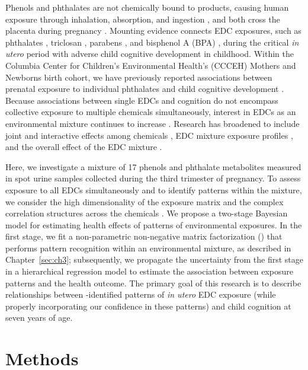 Phenols and phthalates are not chemically bound to products, causing human exposure through inhalation, absorption, and ingestion \cite{vandenberg2007human}, and both cross the placenta during pregnancy \cite{schonfelder2002parent, mose2007phthalate}. Mounting evidence connects EDC exposures, such as phthalates \cite{van2020phthalate, nidens2020prenatal, kim2018association, doherty2017prenatal, kim2011prenatal}, triclosan \cite{jackson2018identifying, guo2020early}, parabens \cite{freire2020association}, and bisphenol A (BPA) \cite{jiang2020prenatal, lin2017prenatal}, during the critical \textit{in utero} period with adverse child cognitive development in childhood. Within the Columbia Center for Children’s Environmental Health's (CCCEH) Mothers and Newborns birth cohort, we have previously reported associations between prenatal exposure to individual phthalates and child cognitive development \cite{factor2014persistent, whyatt2012maternal}. Because associations between single EDCs and cognition do not encompass collective exposure to multiple chemicals simultaneously, interest in EDCs as an environmental mixture continues to increase \cite{braun2016can, taylor16}. Research has broadened to include joint and interactive effects among chemicals \cite{hu2021prenatal}, EDC mixture exposure profiles \cite{kalloo2021chemical}, and the overall effect of the EDC mixture \cite{tanner2020early}.

Here, we investigate a mixture of 17 phenols and phthalate metabolites measured in spot urine samples collected during the third trimester of pregnancy. To assess exposure to all EDCs simultaneously and to identify patterns within the mixture, we consider the high dimensionality of the exposure matrix and the complex correlation structures across the chemicals \cite{taylor16}. We propose a two-stage Bayesian model for estimating health effects of patterns of environmental exposures. In the first stage, we fit a non-parametric non-negative matrix factorization (\bnmfc) that performs pattern recognition within an environmental mixture, as described in Chapter~\ref{sec:ch3}; subsequently, we propagate the uncertainty from the first stage in a hierarchical regression model to estimate the association between exposure patterns and the health outcome. The primary goal of this research is to describe relationships between \bnmfc-identified patterns of \textit{in utero} EDC exposure (while properly incorporating our confidence in these patterns) and child cognition at seven years of age.

\section{Methods}

